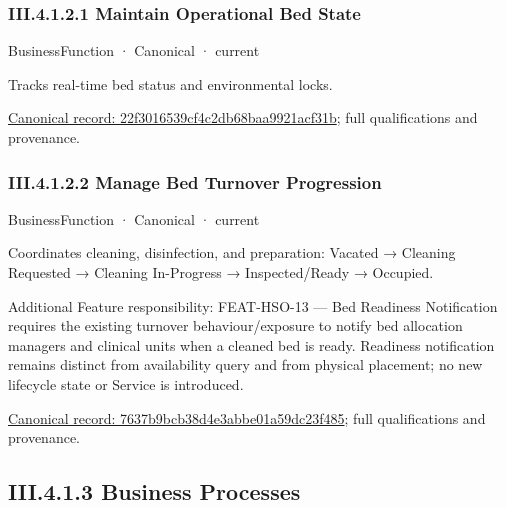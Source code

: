 \subsubsection*{III.4.1.2.1 Maintain Operational Bed State}
\label{navigation:III.4.1.2.1}

\label{element:22f3016539cf4c2db68baa9921acf31b}
{\small BusinessFunction · Canonical · current}\par

Tracks real-time bed status and environmental locks.


{\footnotesize \href{../../../../continuum/business/business-function/22f3016539cf4c2db68baa9921acf31b.md}{Canonical record: 22f3016539cf4c2db68baa9921acf31b}; full qualifications and provenance.}\par
\subsubsection*{III.4.1.2.2 Manage Bed Turnover Progression}
\label{navigation:III.4.1.2.2}

\label{element:7637b9bcb38d4e3abbe01a59dc23f485}
{\small BusinessFunction · Canonical · current}\par

Coordinates cleaning, disinfection, and preparation: Vacated → Cleaning Requested → Cleaning In-Progress → Inspected/Ready → Occupied.



Additional Feature responsibility: FEAT-HSO-13 — Bed Readiness Notification requires the existing turnover behaviour/exposure to notify bed allocation managers and clinical units when a cleaned bed is ready. Readiness notification remains distinct from availability query and from physical placement; no new lifecycle state or Service is introduced.


{\footnotesize \href{../../../../continuum/business/business-function/7637b9bcb38d4e3abbe01a59dc23f485.md}{Canonical record: 7637b9bcb38d4e3abbe01a59dc23f485}; full qualifications and provenance.}\par
\subsection*{III.4.1.3 Business Processes}
\label{navigation:III.4.1.3}

